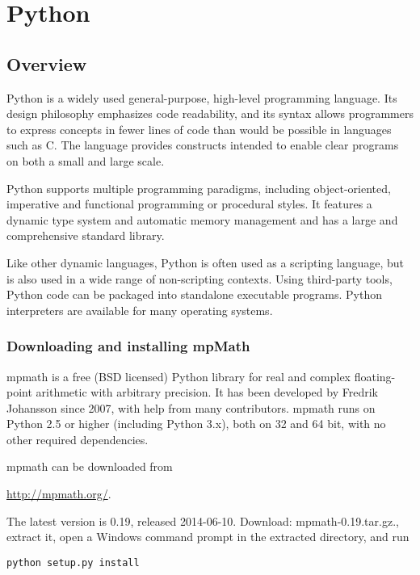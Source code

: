 
\chapter{Python} 

\section{Overview}
Python is a widely used general-purpose, high-level programming language. Its design philosophy emphasizes code readability, and its syntax allows programmers to express concepts in fewer lines of code than would be possible in languages such as C. The language provides constructs intended to enable clear programs on both a small and large scale.

\vpara
Python supports multiple programming paradigms, including object-oriented, imperative and functional programming or procedural styles. It features a dynamic type system and automatic memory management and has a large and comprehensive standard library.

\vpara
Like other dynamic languages, Python is often used as a scripting language, but is also used in a wide range of non-scripting contexts. Using third-party tools, Python code can be packaged into standalone executable programs. Python interpreters are available for many operating systems.





\subsection{Downloading and installing mpMath}

mpmath is a free (BSD licensed) Python library for real and complex floating-point arithmetic with arbitrary precision. It has been developed by Fredrik Johansson since 2007, with help from many contributors. mpmath runs on Python 2.5 or higher (including Python 3.x), both on 32 and 64 bit, with no other required dependencies.

mpmath can be downloaded from

\vpara
\href{http://mpmath.org/}{http://mpmath.org/}.

The latest version is 0.19, released 2014-06-10. Download: mpmath-0.19.tar.gz., extract it, open a Windows command prompt in the extracted directory, and run
\begin{verbatim}
python setup.py install
\end{verbatim}



